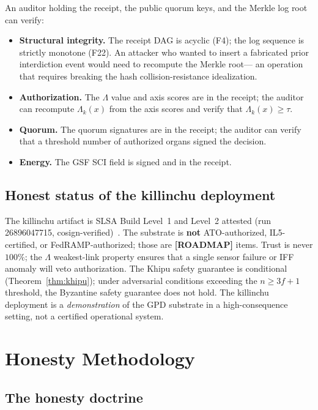 \documentclass[11pt,letterpaper]{article}
\theoremstyle{definition}
\newcommand{\Lam}{\Lambda}
\newcommand{\roadmap}{\textbf{[ROADMAP]}}
\begin{document}
An auditor holding the receipt, the public quorum keys, and the Merkle log root
can verify:
\begin{itemize}
\item \textbf{Structural integrity.} The receipt DAG is acyclic (F4); the log
  sequence is strictly monotone (F22).  An attacker who wanted to insert a
  fabricated prior interdiction event would need to recompute the Merkle root---
  an operation that requires breaking the hash collision-resistance idealization.
\item \textbf{Authorization.}  The $\Lam$ value and axis scores are in the
  receipt; the auditor can recompute $\Lam_k(x)$ from the axis scores and verify
  that $\Lam_k(x) \ge \tau$.
\item \textbf{Quorum.}  The quorum signatures are in the receipt; the auditor
  can verify that a threshold number of authorized organs signed the decision.
\item \textbf{Energy.}  The GSF SCI field is signed and in the receipt.
\end{itemize}

\subsection{Honest status of the killinchu deployment}

The killinchu artifact is SLSA Build Level~1 and Level~2 attested (run
26896047715, cosign-verified)~\cite{szl_v26}.  The substrate is \textbf{not}
ATO-authorized, IL5-certified, or FedRAMP-authorized; those are \roadmap{} items.
Trust is never $100\%$; the $\Lam$ weakest-link property ensures that a single
sensor failure or IFF anomaly will veto authorization.  The Khipu safety
guarantee is conditional (Theorem~\ref{thm:khipu}); under adversarial conditions
exceeding the $n\ge 3f+1$ threshold, the Byzantine safety guarantee does not
hold.  The killinchu deployment is a \emph{demonstration} of the GPD substrate
in a high-consequence setting, not a certified operational system.

\section{Honesty Methodology}
\label{sec:honesty}

\subsection{The honesty doctrine}
\end{document}
